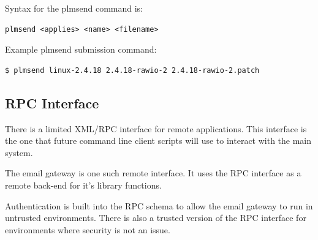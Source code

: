 Syntax for the plmsend command is:

\begin{verbatim}
plmsend <applies> <name> <filename>
\end{verbatim}

Example plmsend submission command:

\begin{verbatim}
$ plmsend linux-2.4.18 2.4.18-rawio-2 2.4.18-rawio-2.patch
\end{verbatim}
  
\subsection{RPC Interface}
There is a limited XML/RPC interface for remote applications.  This interface 
is the one that future command line client scripts will use to interact with 
the main system.

The email gateway is one such remote interface.  It uses the RPC interface as a 
remote back-end for it's library functions.

Authentication is built into the RPC schema to allow the email gateway to run 
in untrusted environments.  There is also a trusted version of the RPC 
interface for environments where security is not an issue.
